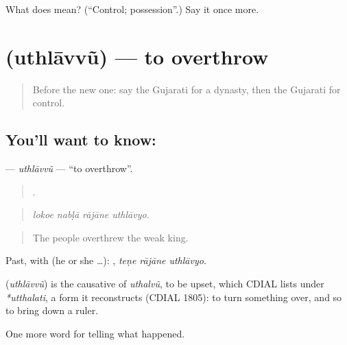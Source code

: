 \begin{tcolorbox}[breakable,colback=teal!4,colframe=teal!35!black,title={Before you move on}]
What does  mean? (\textquotedblleft{}Control; possession\textquotedblright{}.) Say it once more.
\end{tcolorbox}
\section[\texorpdfstring{\gu{ઉથલાવવું} (uthlāvvũ)}{ઉથલાવવું (uthlāvvũ)}]{ (uthlāvvũ) — to overthrow}

\label{lesson:GU-C324-uthlavvu}



\begin{quote}
Before the new one: say the Gujarati for a dynasty, then the Gujarati for control.
\end{quote}

\subsection*{You'll want to know: }
\textbf{} — \emph{uthlāvvũ} — \textquotedblleft{}to overthrow\textquotedblright{}.

\begin{quote}
   .
\end{quote}

\begin{quote}
\emph{lokoe nabḷā rājāne uthlāvyo.}
\end{quote}

\begin{quote}
The people overthrew the weak king.
\end{quote}

Past, with  (he or she …):   , \emph{teṇe rājāne uthlāvyo}.

\begin{cousinweb}
\textbf{} (\emph{uthlāvvũ}) is the causative of \emph{uthalvũ}, to be upset, which CDIAL lists under \emph{*utthalati}, a form it reconstructs (CDIAL 1805): to turn something over, and so to bring down a ruler.
\end{cousinweb}

\begin{grammarlens}[title={What you've built}]
One more word for telling what happened.
\end{grammarlens}

